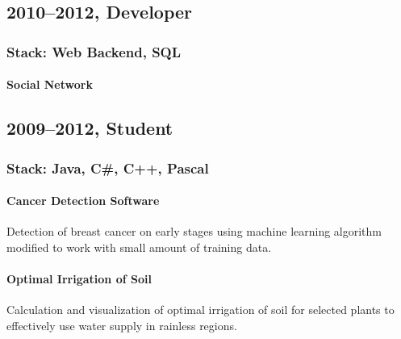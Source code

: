 \subsection*{2010–2012, Developer}
\subsubsection*{Stack: Web Backend, SQL}
\paragraph{Social Network}

\subsection*{2009–2012, Student}
\subsubsection*{Stack: Java, C\#, C++, Pascal}

\paragraph{Cancer Detection Software}
Detection of breast cancer on early stages using machine learning algorithm modified to work with small amount of training data.

\paragraph{Optimal Irrigation of Soil}
Calculation and visualization of optimal irrigation of soil for selected plants to effectively use water supply in rainless regions.


